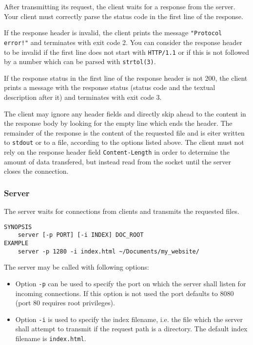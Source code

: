 After transmitting its request, the client waits for a response from the server.
Your client must correctly parse the status code
in the first line of the response.

If the response header is invalid,
the client prints the message \texttt{"Protocol error!"}
and terminates with exit code 2.
You can consider the response header to be invalid
if the first line does not start with \verb|HTTP/1.1|
or if this is not followed by a number
which can be parsed with \verb|strtol(3)|.

If the response status in the first line of the response header is not 200,
the client prints a message with the response status
(status code and the textual description after it)
and terminates with exit code 3.

The client may ignore any header fields
and directly skip ahead to the content in the response body
by looking for the empty line which ends the header.
The remainder of the response is the content of the requested file
and is eiter written to \verb|stdout| or to a file,
according to the options listed above.
The client must not rely on the response header field \verb|Content-Length|
in order to determine the amount of data transfered,
but instead read from the socket until the server closes the connection.

\subsubsection*{Server}

The server waits for connections from clients
and transmits the requested files.

\begin{verbatim}
SYNOPSIS
    server [-p PORT] [-i INDEX] DOC_ROOT
EXAMPLE
    server -p 1280 -i index.html ~/Documents/my_website/
\end{verbatim}

The server may be called with following options:
\begin{itemize}
\item Option \texttt{-p} can be used to specify the port
on which the server shall listen for incoming connections.
If this option is not used the port defaults to 8080
(port 80 requires root privileges).
\item Option \texttt{-i} is used to specify the index filename,
i.e. the file which the server shall attempt to transmit
if the request path is a directory.
The default index filename is \verb|index.html|.
\end{itemize}

